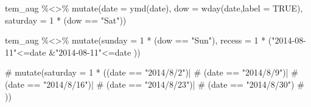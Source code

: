 \documentclass[
  letterpaper,
  DIV=11,
  numbers=noendperiod]{scrreprt}
\newenvironment{Shaded}{\begin{snugshade}}{\end{snugshade}}
\newcommand{\AttributeTok}[1]{\textcolor[rgb]{0.40,0.45,0.13}{#1}}
\newcommand{\CommentTok}[1]{\textcolor[rgb]{0.37,0.37,0.37}{#1}}
\newcommand{\ConstantTok}[1]{\textcolor[rgb]{0.56,0.35,0.01}{#1}}
\newcommand{\DecValTok}[1]{\textcolor[rgb]{0.68,0.00,0.00}{#1}}
\newcommand{\FunctionTok}[1]{\textcolor[rgb]{0.28,0.35,0.67}{#1}}
\newcommand{\NormalTok}[1]{\textcolor[rgb]{0.00,0.23,0.31}{#1}}
\newcommand{\OtherTok}[1]{\textcolor[rgb]{0.00,0.23,0.31}{#1}}
\newcommand{\SpecialCharTok}[1]{\textcolor[rgb]{0.37,0.37,0.37}{#1}}
\newcommand{\StringTok}[1]{\textcolor[rgb]{0.13,0.47,0.30}{#1}}
\begin{document}
\begin{Shaded}
\begin{Highlighting}[]
\NormalTok{tem\_aug }\SpecialCharTok{\%\textless{}\textgreater{}\%}
  \FunctionTok{mutate}\NormalTok{(}\AttributeTok{date =} \FunctionTok{ymd}\NormalTok{(date),}
         \AttributeTok{dow =} \FunctionTok{wday}\NormalTok{(date,}\AttributeTok{label =} \ConstantTok{TRUE}\NormalTok{),}
         \AttributeTok{saturday =} \DecValTok{1} \SpecialCharTok{*}\NormalTok{ (dow }\SpecialCharTok{==} \StringTok{"Sat"}\NormalTok{))}

\NormalTok{tem\_aug }\SpecialCharTok{\%\textless{}\textgreater{}\%}
  \FunctionTok{mutate}\NormalTok{(}\AttributeTok{sunday =} \DecValTok{1} \SpecialCharTok{*}\NormalTok{ (dow }\SpecialCharTok{==} \StringTok{"Sun"}\NormalTok{),}
         \AttributeTok{recess =} \DecValTok{1} \SpecialCharTok{*}\NormalTok{ (}\StringTok{"2014{-}08{-}11"}\SpecialCharTok{\textless{}=}\NormalTok{date }\SpecialCharTok{\&}\StringTok{"2014{-}08{-}11"}\SpecialCharTok{\textless{}=}\NormalTok{date ))}


  
\CommentTok{\#  mutate(saturday = 1 * ((date == "2014/8/2")|}
\CommentTok{\#                         (date == "2014/8/9")|}
\CommentTok{\#                         (date == "2014/8/16")|}
\CommentTok{\#                         (date == "2014/8/23")|}
\CommentTok{\#                         (date == "2014/8/30")}
\CommentTok{\#  ))}
\end{Highlighting}
\end{Shaded}

\begin{Shaded}
\end{Shaded}
\end{document}
